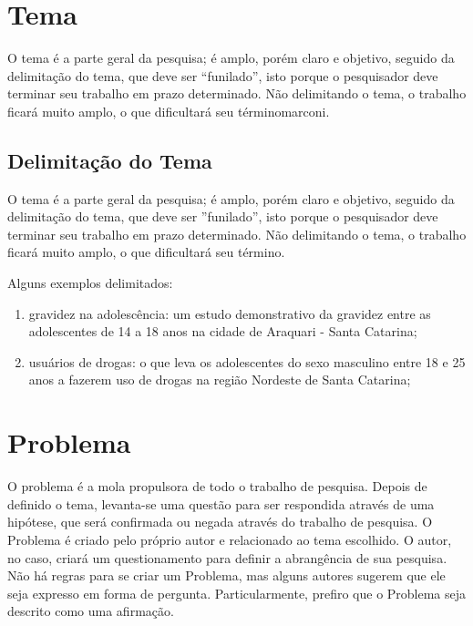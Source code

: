 \documentclass[12pt,article,a4paper,brazil,oldfontcommands,oneside]{abntex2}
\begin{document}
\frenchspacing 		%
\maketitle			%


\section{Tema}

O tema é a parte geral da pesquisa; é amplo, porém claro e objetivo, seguido da delimitação do tema, que deve ser ``funilado'', isto porque o pesquisador deve terminar seu trabalho em prazo determinado. Não delimitando o tema, o trabalho ficará muito amplo, o que dificultará seu término{marconi}.

\subsection{Delimitação do Tema}

O tema é a parte geral da pesquisa; é amplo, porém claro e objetivo, seguido da delimitação do tema, que deve ser ''funilado'', isto porque o pesquisador deve terminar seu trabalho em prazo determinado. Não delimitando o tema, o trabalho ficará muito amplo, o que dificultará seu término.

Alguns exemplos delimitados:

\begin{enumerate}
\item gravidez na adolescência: um estudo demonstrativo da gravidez entre as adolescentes de 14 a 18 anos na cidade de Araquari - Santa Catarina;
\item usuários de drogas: o que leva os adolescentes do sexo masculino entre 18 e 25 anos a fazerem uso de drogas na região Nordeste de Santa Catarina;
\end{enumerate}

\section{Problema}

O problema é a mola propulsora de todo o trabalho de pesquisa. Depois de definido o tema, levanta-se uma questão para ser respondida através de uma hipótese, que será confirmada ou negada através do trabalho de pesquisa. O Problema é criado pelo próprio autor e relacionado ao tema escolhido. O autor, no caso, criará um questionamento para definir a abrangência de sua pesquisa. Não há regras para se criar um Problema, mas alguns autores sugerem que ele seja expresso em forma de pergunta. Particularmente, prefiro que o Problema seja descrito como uma afirmação.
\end{document}
